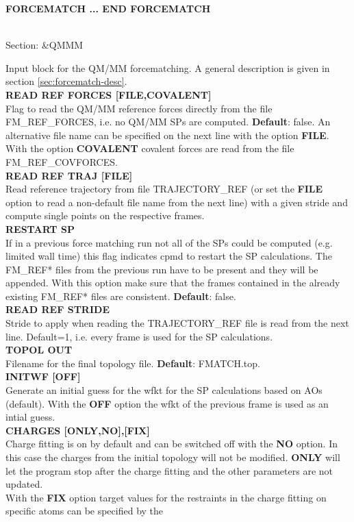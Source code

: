 \documentclass[twoside,10pt,titlepage,a4paper]{article}
\newcommand{\reflabel}[1]{\hypertarget{#1}}
\newcommand{\reflabel}[1]{\label{#1}}
\newcommand{\keyword}[5]{%
\vspace{1.0cm}
\begin{minipage}{15cm}
\reflabel{#1}{\textbf{\large #1}}%
\index{#1}%
\ \textbf{#2}%
\ \textbf{#3}%
\ \textit{#4}%
     \hfill\\\smallskip
     {Section: #5}
     \hfill\\\smallskip\vskip 10pt
\end{minipage}
}%
\newcommand{\desc}[1]{%
   \hspace*{\fill} \parbox{130mm}{\sloppy
                          {#1}%
                             }
     \hfill\\\smallskip
   }%
\newcommand{\desc}[1]{#1\vspace{1ex}}
\begin{document}
\keyword{FORCEMATCH ... END FORCEMATCH}{}{}{}{\&QMMM}
\desc{Input block for the QM/MM forcematching. A general description is given in section \ref{sec:forcematch-desc}. \\
   \textbf{READ REF FORCES [FILE,COVALENT]}\\
Flag to read the QM/MM reference forces directly from the file FM\_REF\_FORCES, i.e. no QM/MM SPs
are computed. \textbf{Default}: false. An alternative file name can be specified on the next line
with the option \textbf{FILE}. With the option \textbf{COVALENT} covalent forces are read from the
file FM\_REF\_COVFORCES. \\ \textbf{READ REF TRAJ [FILE]} \\
Read reference trajectory from file TRAJECTORY\_REF (or set the \textbf{FILE} option to read a non-default file name from the next line) with a given stride and compute single points on the respective frames. \\
\textbf{RESTART SP} \\
If in a previous force matching run not all of the SPs could be computed (e.g. limited wall time)
this flag indicates cpmd to restart the SP calculations. The FM\_REF* files from the previous run
have to be present and they will be appended. With this option make sure that the frames contained
in the already existing FM\_REF* files are consistent. \textbf{Default}: false. \\ \textbf{READ REF
STRIDE} \\
Stride to apply when reading the TRAJECTORY\_REF file is read from the next line. Default=1, i.e. every frame is used for the SP calculations. \\
\textbf{TOPOL OUT} \\
Filename for the final topology file. \textbf{Default}: FMATCH.top. \\
\textbf{INITWF [OFF]} \\
Generate an initial guess for the wfkt for the SP calculations based on AOs (default). With the \textbf{OFF} option the wfkt of the previous frame is used as an intial guess.\\
\textbf{CHARGES [ONLY,NO],[FIX]} \\
Charge fitting is on by default and can be switched off with the \textbf{NO} option. In this case
the charges from the initial topology will not be modified. \textbf{ONLY} will let the program stop
after the charge fitting and the other parameters are not updated. \\ With the \textbf{FIX} option
target values for the restraints in the charge fitting on specific atoms can be specified by the
}
\end{document}
